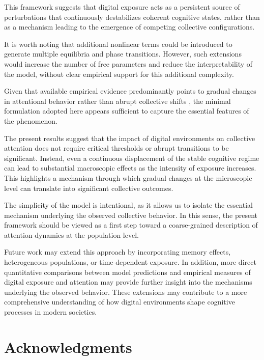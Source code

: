 \documentclass[preprint,12pt]{elsarticle}
\begin{document}
This framework suggests that digital exposure acts as a persistent source of perturbations that continuously destabilizes coherent cognitive states, rather than as a mechanism leading to the emergence of competing collective configurations.


It is worth noting that additional nonlinear terms could be introduced to generate multiple equilibria and phase transitions. However, such extensions would increase the number of free parameters and reduce the interpretability of the model, without clear empirical support for this additional complexity.

Given that available empirical evidence predominantly points to gradual changes in attentional behavior rather than abrupt collective shifts \cite{mark1,mark2,gazzaley,ophir}, the minimal formulation adopted here appears sufficient to capture the essential features of the phenomenon. 


The present results suggest that the impact of digital environments on collective attention does not require critical thresholds or abrupt transitions to be significant. Instead, even a continuous displacement of the stable cognitive regime can lead to substantial macroscopic effects as the intensity of exposure increases. This highlights a mechanism through which gradual changes at the microscopic level can translate into significant collective outcomes.


The simplicity of the model is intentional, as it allows us to isolate the essential mechanism underlying the observed collective behavior. In this sense, the present framework should be viewed as a first step toward a coarse-grained description of attention dynamics at the population level.

Future work may extend this approach by incorporating memory effects, heterogeneous populations, or time-dependent exposure. In addition, more direct quantitative comparisons between model predictions and empirical measures of digital exposure and attention may provide further insight into the mechanisms underlying the observed behavior. These extensions may contribute to a more comprehensive understanding of how digital environments shape cognitive processes in modern societies.









\section*{Acknowledgments}
\end{document}
